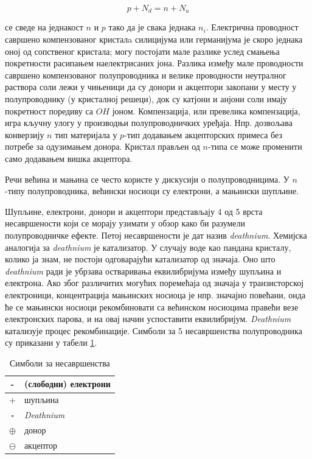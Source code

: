 \documentclass{article}
\begin{document}
\begin{equation}
    p + N_d = n + N_a
\end{equation}

се сведе на једнакост $n$ и $p$ тако да је свака једнака $n_i$. Електрична проводност савршено компензованог кристалa силицијума или германијума је скоро једнака оној од сопственог кристала; могу постојати мале разлике услед смањења покретности расипањем наелектрисаних јона. Разлика између мале проводности савршено компензованог полупроводника и велике проводности неутралног раствора соли лежи у чињеници да су донори и акцептори закопани у месту у полупроводнику (у кристалној решеци), док су катјони и анјони соли имају покретност поредиву са $OH$ јоном. Компензација, или превелика компензација, игра кључну улогу у производњи полупроводничких уређаја. Нпр. дозвољава конверзију $n$ тип материјала у $p$-тип додавањем акцепторских примеса без потребе за одузимањем донора. Кристал прављен од $n$-типа се може променити само додавањем вишка акцептора.

Речи већина и мањина се често користе у дискусији о полупроводницима. У $n$ -типу полупроводника, већински носиоци су електрони, а мањински шупљине.

Шупљине, електрони, донори и акцептори представљају 4 од 5 врста несавршености који се морају узимати у обзор како би разумели полупроводничке ефекте. Петој несавршености је дат назив \textit{deathnium}. Хемијска аналогија за \textit{deathnium} је катализатор. У случају воде као пандана кристалу, колико ја знам, не постоји одговарајући катализатор од значаја. Оно што \textit{deathnium} ради је убрзава остваривања еквилибријума између шупљина и електрона. Ако због различитих могућих поремећаја од значаја у транзисторској електроници, концентрација мањинских носиоца је нпр. значајно повећани, онда ће се мањински носиоци рекомбиновати са већинском носиоцима правећи везе електронских парова, и на овај начин успоставити еквилибријум. \textit{Deathnium} катализује процес рекомбинације. Симболи за 5 несавршенства полупроводника су приказани у табели \ref{table:imperfections-symbols}.


\begin{table}[ht]
	\centering
	\begin{tabular}{|c|l|}
		\hline
		- & (слободни) електрони \\
		\hline
		+ & шупљина\\ 
		\hline
		$\square$ & \textit{Deathnium} \\ 
		\hline
        $\oplus$ & донор\\ 
		\hline
		$\ominus$ & акцептор \\ 
		\hline
        
	\end{tabular}
	\caption{Симболи за несавршенства} 
    \label{table:imperfections-symbols}
\end{table}
\end{document}
